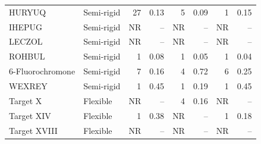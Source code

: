 \begin{table}[H]
\begin{tabular}{@{}llrrrrrr@{}}
HURYUQ & Semi-rigid & 27 & 0.13 & 5 & 0.09 & 1 & 0.15 \\
IHEPUG & Semi-rigid & NR & -- & NR & -- & NR & -- \\
LECZOL & Semi-rigid & NR & -- & NR & -- & NR & -- \\
ROHBUL & Semi-rigid & 1 & 0.08 & 1 & 0.05 & 1 & 0.04 \\
6-Fluorochromone & Semi-rigid & 7 & 0.16 & 4 & 0.72 & 6 & 0.25 \\
WEXREY & Semi-rigid & 1 & 0.45 & 1 & 0.19 & 1 & 0.45 \\
\addlinespace[3pt]
Target X & Flexible & NR & -- & 4 & 0.16 & NR & -- \\
Target XIV & Flexible & 1 & 0.38 & NR & -- & 1 & 0.18 \\
Target XVIII & Flexible & NR & -- & NR & -- & NR & -- \\
\bottomrule
\end{tabular}%
\end{table}